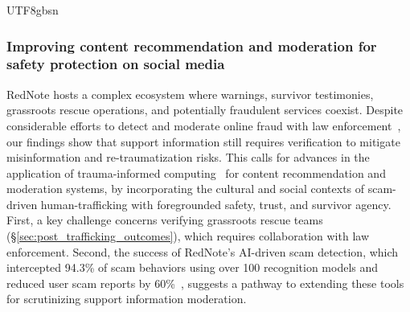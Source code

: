 \documentclass[sigconf,nonacm]{acmart}
\newcommand{\rev}[1]{#1}
\begin{document}
\begin{CJK}{UTF8}{gbsn}
\subsubsection{\rev{Improving content recommendation and moderation for safety protection on social media}}

\rev{RedNote hosts a complex ecosystem where warnings, survivor testimonies, grassroots rescue operations, and potentially fraudulent services coexist. Despite considerable efforts to detect and moderate online fraud with law enforcement~\cite{peoplenews25}, our findings show that support information still requires verification to mitigate misinformation and re-traumatization risks. This calls for advances in the application of trauma-informed computing~\cite{chen2022trauma} for content recommendation and moderation systems, by incorporating the cultural and social contexts of scam-driven human-trafficking with foregrounded safety, trust, and survivor agency. First, a key challenge concerns verifying grassroots rescue teams (\S\ref{sec:post_trafficking_outcomes}), which requires collaboration with law enforcement. Second, the success of RedNote's AI-driven scam detection, which intercepted 94.3\% of scam behaviors using over 100 recognition models and reduced user scam reports by 60\%~\cite{peoplenews25}, suggests a pathway to extending these tools for scrutinizing support information moderation.}


\end{CJK}
\end{document}
